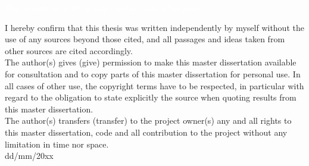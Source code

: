 \textcolor{white}{This is done in order to skip the first half of the page}\\
\fontsize{10}{12}

\vspace{15cm}%

%
%
%
%

\noindent\textsf{I hereby confirm that this thesis was written independently by myself without the use of any sources beyond those cited, and all passages and ideas taken from other sources are cited accordingly.}\\

\noindent\textsf{The author(s) gives (give) permission to make this master dissertation available for consultation and to copy parts of this master dissertation for personal use. In all cases of other use, the copyright terms have to be respected, in particular with regard to the obligation to state explicitly the source when quoting results from this master dissertation.}\\

\noindent\textsf{The author(s) transfers (transfer) to the project owner(s) any and all rights to this master dissertation, code and all contribution to the project without any limitation in time nor space.}\\

\noindent\textsf{dd/mm/20xx}